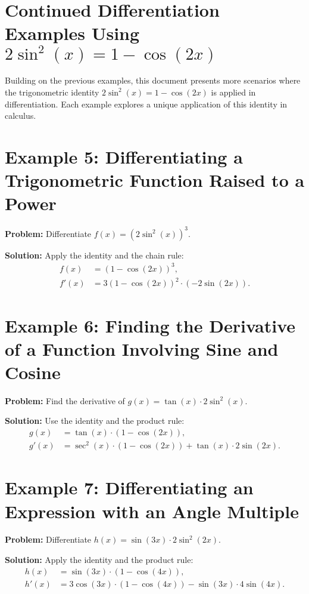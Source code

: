 \documentclass[a4paper,12pt]{book}
\newcounter{example}
\begin{document}
\section*{Continued Differentiation Examples Using \(2 \sin^2(x) = 1 - \cos(2x)\)}
Building on the previous examples, this document presents more scenarios where the trigonometric identity \(2 \sin^2(x) = 1 - \cos(2x)\) is applied in differentiation. Each example explores a unique application of this identity in calculus.

\section*{Example 5: Differentiating a Trigonometric Function Raised to a Power}
\textbf{Problem:} Differentiate \(f(x) = (2 \sin^2(x))^3\).

\textbf{Solution:}
Apply the identity and the chain rule:
\begin{align*}
f(x) &= (1 - \cos(2x))^3, \\
f'(x) &= 3(1 - \cos(2x))^2 \cdot (-2 \sin(2x)).
\end{align*}

\section*{Example 6: Finding the Derivative of a Function Involving Sine and Cosine}
\textbf{Problem:} Find the derivative of \(g(x) = \tan(x) \cdot 2 \sin^2(x)\).

\textbf{Solution:}
Use the identity and the product rule:
\begin{align*}
g(x) &= \tan(x) \cdot (1 - \cos(2x)), \\
g'(x) &= \sec^2(x) \cdot (1 - \cos(2x)) + \tan(x) \cdot 2 \sin(2x).
\end{align*}

\section*{Example 7: Differentiating an Expression with an Angle Multiple}
\textbf{Problem:} Differentiate \(h(x) = \sin(3x) \cdot 2 \sin^2(2x)\).

\textbf{Solution:}
Apply the identity and the product rule:
\begin{align*}
h(x) &= \sin(3x) \cdot (1 - \cos(4x)), \\
h'(x) &= 3 \cos(3x) \cdot (1 - \cos(4x)) - \sin(3x) \cdot 4 \sin(4x).
\end{align*}
\end{document}
